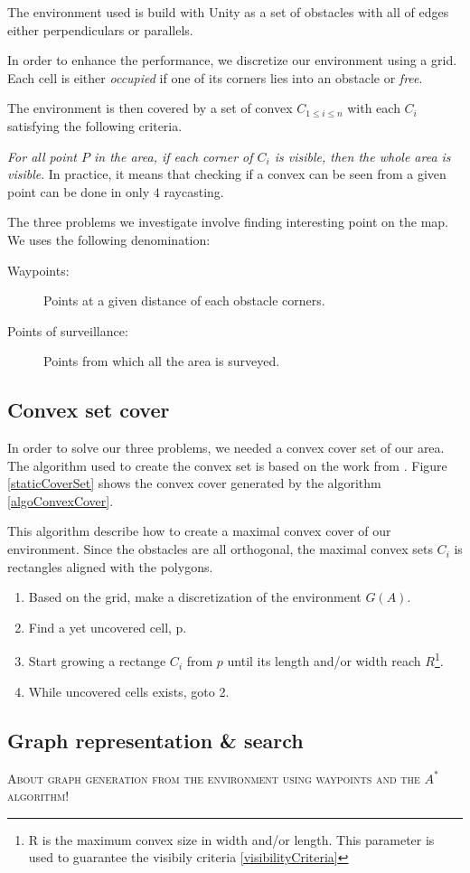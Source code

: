 The environment used is build with Unity as a set of obstacles with all of edges either perpendiculars or parallels.

In order to enhance the performance, we discretize our environment using a grid. Each cell is either \emph{occupied} if one of its corners lies into an obstacle or \emph{free}.

The environment is then covered by a set of convex $C_{1\leq i \leq n}$ with each $C_i$ satisfying the following criteria.

\begin{criteria}[of Visibility]
 \emph{For all point $P$ in the area, if each corner of $C_i$ is visible, then the whole area is visible}. In practice, it means that checking if a convex can be seen from a given point can be done in only $4$ raycasting.
\label{visibilityCriteria}
\end{criteria}

The three problems we investigate involve finding interesting point on the map. We uses the following denomination:
\begin{description}
	\item[Waypoints:] Points at a given distance of each obstacle corners.
	\item[Points of surveillance:] Points from which all the area is surveyed.
\end{description}

\subsection{Convex set cover}

In order to solve our three problems, we needed a convex cover set of our area. The algorithm used to create the convex set is based on the work from \cite{CoopMinTime}. Figure \ref{staticCoverSet} shows the convex cover generated by the algorithm \ref{algoConvexCover}.

\begin{algorithm}
This algorithm describe how to create a maximal convex cover of our environment. Since the obstacles are all orthogonal, the maximal convex sets $C_i$ is rectangles aligned with the polygons.
\begin{enumerate}
\item Based on the grid, make a discretization of the environment $G(A)$.
\item Find a yet uncovered cell, p.
\item Start growing a rectange $C_i$ from $p$ until its length and/or width reach $R$\footnote{R is the maximum convex size in width and/or length. This parameter is used to guarantee the visibily criteria \ref{visibilityCriteria}}.
\item While uncovered cells exists, goto 2.
\end{enumerate}
\label{algoConvexCover}
\end{algorithm}

\subsection{Graph representation \& search}

\textsc{About graph generation from the environment using waypoints and the $A^{\ast}$ algorithm!}
